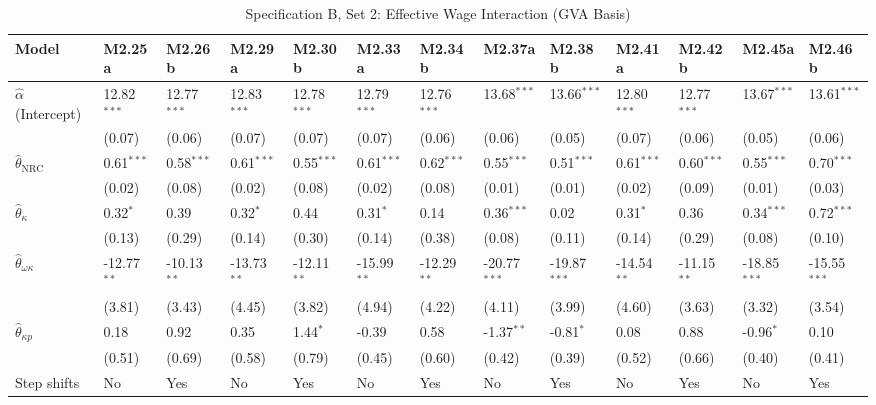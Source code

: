 \FloatBarrier
\begin{table}[h!]
\centering
\caption{Specification B, Set 2: Effective Wage Interaction (GVA Basis)}
\label{tab:specB_set2_gva_app}
\tiny
\setlength{\tabcolsep}{1.5pt}
\begin{tabular}{p{3.2cm}p{1.0cm}p{1.0cm}p{1.0cm}p{1.0cm}p{1.0cm}p{1.0cm}p{1.0cm}p{1.0cm}p{1.0cm}p{1.0cm}p{1.0cm}p{1.0cm}}
\toprule
Model & M2.25a & M2.26b & M2.29a & M2.30b & M2.33a & M2.34b & M2.37a & M2.38b & M2.41a & M2.42b & M2.45a & M2.46b \\
\midrule
$\hat{\alpha}$ (Intercept) & 12.82$^{***}$ & 12.77$^{***}$ & 12.83$^{***}$ & 12.78$^{***}$ & 12.79$^{***}$ & 12.76$^{***}$ & 13.68$^{***}$ & 13.66$^{***}$ & 12.80$^{***}$ & 12.77$^{***}$ & 13.67$^{***}$ & 13.61$^{***}$ \\
 & (0.07) & (0.06) & (0.07) & (0.07) & (0.07) & (0.06) & (0.06) & (0.05) & (0.07) & (0.06) & (0.05) & (0.06) \\
$\hat{\theta}_{\text{NRC}}$ & 0.61$^{***}$ & 0.58$^{***}$ & 0.61$^{***}$ & 0.55$^{***}$ & 0.61$^{***}$ & 0.62$^{***}$ & 0.55$^{***}$ & 0.51$^{***}$ & 0.61$^{***}$ & 0.60$^{***}$ & 0.55$^{***}$ & 0.70$^{***}$ \\
 & (0.02) & (0.08) & (0.02) & (0.08) & (0.02) & (0.08) & (0.01) & (0.01) & (0.02) & (0.09) & (0.01) & (0.03) \\
$\hat{\theta}_{\kappa}$ & 0.32$^{*}$ & 0.39 & 0.32$^{*}$ & 0.44 & 0.31$^{*}$ & 0.14 & 0.36$^{***}$ & 0.02 & 0.31$^{*}$ & 0.36 & 0.34$^{***}$ & 0.72$^{***}$ \\
 & (0.13) & (0.29) & (0.14) & (0.30) & (0.14) & (0.38) & (0.08) & (0.11) & (0.14) & (0.29) & (0.08) & (0.10) \\
$\hat{\theta}_{\omega\kappa}$ & -12.77$^{**}$ & -10.13$^{**}$ & -13.73$^{**}$ & -12.11$^{**}$ & -15.99$^{**}$ & -12.29$^{**}$ & -20.77$^{***}$ & -19.87$^{***}$ & -14.54$^{**}$ & -11.15$^{**}$ & -18.85$^{***}$ & -15.55$^{***}$ \\
 & (3.81) & (3.43) & (4.45) & (3.82) & (4.94) & (4.22) & (4.11) & (3.99) & (4.60) & (3.63) & (3.32) & (3.54) \\
$\hat{\theta}_{\kappa p}$ & 0.18 & 0.92 & 0.35 & 1.44$^{*}$ & -0.39 & 0.58 & -1.37$^{**}$ & -0.81$^{*}$ & 0.08 & 0.88 & -0.96$^{*}$ & 0.10 \\
 & (0.51) & (0.69) & (0.58) & (0.79) & (0.45) & (0.60) & (0.42) & (0.39) & (0.52) & (0.66) & (0.40) & (0.41) \\
\midrule
Step shifts & No & Yes & No & Yes & No & Yes & No & Yes & No & Yes & No & Yes \\

\end{tabular}
\end{table}
